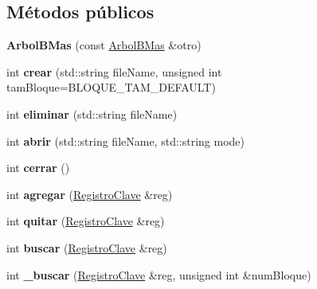 \subsection*{\-Métodos públicos}
\begin{DoxyCompactItemize}
\item 
\hypertarget{class_arbol_b_mas_a1ae6c616364799341242e13db7ce0b0b}{{\bfseries \-Arbol\-B\-Mas} (const \hyperlink{class_arbol_b_mas}{\-Arbol\-B\-Mas} \&otro)}\label{class_arbol_b_mas_a1ae6c616364799341242e13db7ce0b0b}

\item 
\hypertarget{class_arbol_b_mas_abf229394612d9d94978426248007adee}{int {\bfseries crear} (std\-::string file\-Name, unsigned int tam\-Bloque=\-B\-L\-O\-Q\-U\-E\-\_\-\-T\-A\-M\-\_\-\-D\-E\-F\-A\-U\-L\-T)}\label{class_arbol_b_mas_abf229394612d9d94978426248007adee}

\item 
\hypertarget{class_arbol_b_mas_a7d0ca1d45a7fa5c89e6b421d615e8f68}{int {\bfseries eliminar} (std\-::string file\-Name)}\label{class_arbol_b_mas_a7d0ca1d45a7fa5c89e6b421d615e8f68}

\item 
\hypertarget{class_arbol_b_mas_ae67a8f214b7c7b23da3ff1d9279b4231}{int {\bfseries abrir} (std\-::string file\-Name, std\-::string mode)}\label{class_arbol_b_mas_ae67a8f214b7c7b23da3ff1d9279b4231}

\item 
\hypertarget{class_arbol_b_mas_a3434cc664b6c7b68bd0405c6f8e6efc0}{int {\bfseries cerrar} ()}\label{class_arbol_b_mas_a3434cc664b6c7b68bd0405c6f8e6efc0}

\item 
\hypertarget{class_arbol_b_mas_a33b593b233eee7ef9be6c4ab74106e11}{int {\bfseries agregar} (\hyperlink{class_registro_clave}{\-Registro\-Clave} \&reg)}\label{class_arbol_b_mas_a33b593b233eee7ef9be6c4ab74106e11}

\item 
\hypertarget{class_arbol_b_mas_aa345b6b99ea4b9d5772e2ad6bf622920}{int {\bfseries quitar} (\hyperlink{class_registro_clave}{\-Registro\-Clave} \&reg)}\label{class_arbol_b_mas_aa345b6b99ea4b9d5772e2ad6bf622920}

\item 
\hypertarget{class_arbol_b_mas_aac9d7f5e500cd632ca16c4224f248390}{int {\bfseries buscar} (\hyperlink{class_registro_clave}{\-Registro\-Clave} \&reg)}\label{class_arbol_b_mas_aac9d7f5e500cd632ca16c4224f248390}

\item 
\hypertarget{class_arbol_b_mas_a811d3e2c39d695bd4cfab5544796602d}{int {\bfseries \-\_\-buscar} (\hyperlink{class_registro_clave}{\-Registro\-Clave} \&reg, unsigned int \&num\-Bloque)}\label{class_arbol_b_mas_a811d3e2c39d695bd4cfab5544796602d}


\end{DoxyCompactItemize}
